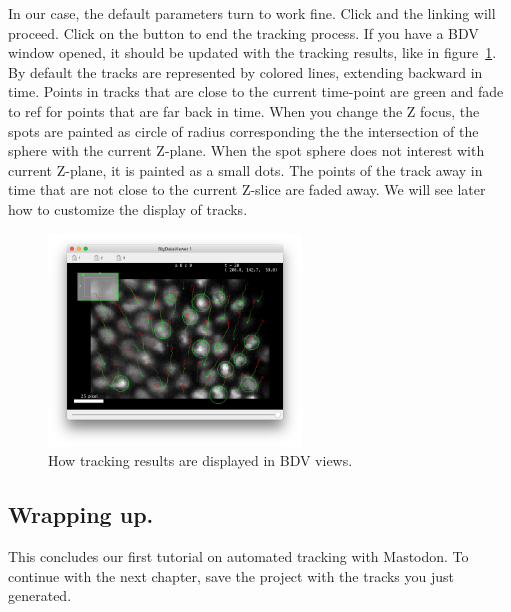 In our case, the default parameters turn to work fine. 
Click  and the linking will proceed. 
Click on the  button to end the tracking process.
If you have a BDV window opened, it should be updated with the tracking results, like in figure~\ref{fig:Tracking results}.
By default the tracks are represented by colored lines, extending backward in time.
Points in tracks that are close to the current time-point are green and fade to ref for points that are far back in time.
When you change the Z focus, the spots are painted as circle of radius corresponding the the intersection of the sphere with the current Z-plane. 
When the spot sphere does not interest with current Z-plane, it is painted as a small dots.
The points of the track away in time that are not close to the current Z-slice are faded away.
We will see later how to customize the display of tracks. 
 
 
\begin{figure}
    \centering
    \includegraphics[width=0.6\textwidth,trim=0.5cm .5cm .5cm .5cm,clip]{figures/Mastodon_LinkingResults.png}
     \caption{How tracking results are displayed in BDV views.}
     \label{fig:Tracking results}
\end{figure}  
 
\subsection{Wrapping up.} 

This concludes our first tutorial on automated tracking with Mastodon.
To continue with the next chapter, save the project with the tracks you just generated.


